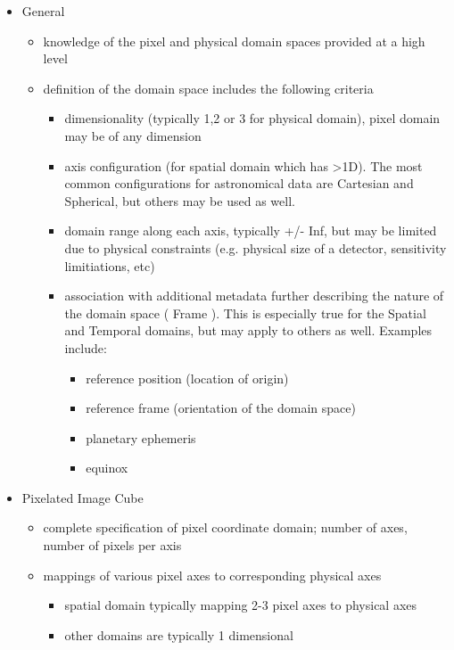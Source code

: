 \documentclass[11pt,a4paper]{ivoa}
\begin{document}
  \begin{itemize}
    \item General
    \begin{itemize}
       \item knowledge of the pixel and physical domain spaces provided at a high level
       \item definition of the domain space includes the following criteria
       \begin{itemize}
          \item dimensionality (typically 1,2 or 3 for physical domain), pixel domain may be of any dimension
          \item axis configuration (for spatial domain which has >1D).  The most common configurations for astronomical data are Cartesian and Spherical, but others may be used as well.
          \item domain range along each axis, typically +/- Inf, but may be limited due to physical constraints (e.g. physical size of a detector, sensitivity limitiations, etc)
          \item association with additional metadata further describing the nature of the domain space ( Frame ).  This is especially true for the Spatial and Temporal domains, but may apply to others as well.  Examples include:
          \begin{itemize}
             \item reference position (location of origin)
             \item reference frame (orientation of the domain space)
             \item planetary ephemeris
             \item equinox
          \end{itemize}
       \end{itemize}
    \end{itemize}
    \item Pixelated Image Cube
    \begin{itemize}
       \item complete specification of pixel coordinate domain; number of axes, number of pixels per axis
       \item mappings of various pixel axes to corresponding physical axes
       \begin{itemize}
          \item spatial domain typically mapping 2-3 pixel axes to physical axes
          \item other domains are typically 1 dimensional

\end{itemize}
\end{itemize}
\end{itemize}
\end{document}
